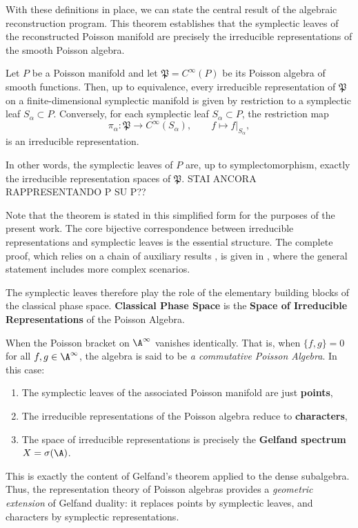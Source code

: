 With these definitions in place, we can state the central result of the algebraic reconstruction program. This theorem establishes that the symplectic leaves of the reconstructed Poisson manifold are precisely the irreducible representations of the smooth Poisson algebra.

\begin{theorem}\label{thm:poisson-rep}
	Let \(P\) be a Poisson manifold and let \(\mathfrak P = C^\infty(P)\) be its Poisson algebra of smooth functions. Then, up to equivalence, every irreducible representation of \(\mathfrak P\) on a finite-dimensional symplectic manifold is given by restriction to a symplectic leaf \(S_\alpha \subset P\). Conversely, for each symplectic leaf \(S_\alpha \subset P\), the restriction map
	\[
	\pi_\alpha: \mathfrak P \to C^\infty(S_\alpha), \qquad f \mapsto f|_{S_\alpha},
	\]
	is an irreducible representation.
	
	In other words, the symplectic leaves of \(P\) are, up to symplectomorphism, exactly the irreducible representation spaces of \(\mathfrak P\).
	STAI ANCORA RAPPRESENTANDO P SU P??
\end{theorem}
\begin{remark} Note that the theorem is stated in this simplified form for the purposes of the present work. The core bijective correspondence between irreducible representations and symplectic leaves is the essential structure. The complete proof, which relies on a chain of auxiliary results \cite[Propositions 2.3.5, 2.3.7, 2.6.4 and Corollary 2.6.5]{landsmanMathematicalTopicsClassical1998}, is given in \cite[Theorem 2.6.7]{landsmanMathematicalTopicsClassical1998} , where the general statement includes more complex scenarios.
\end{remark}

The symplectic leaves therefore play the role of the elementary building blocks of the classical phase space. \textbf{Classical Phase Space} is the \textbf{Space of Irreducible Representations} of the Poisson Algebra.

\noindent When the Poisson bracket on \(\A^\infty\) vanishes identically. That is, when \(\{f,g\} = 0\) for all \(f,g \in \A^\infty\), the algebra is said to be \emph{a commutative Poisson Algebra}. In this case:

\begin{enumerate}
	\item The symplectic leaves of the associated Poisson manifold are just \textbf{points},
	\item The irreducible representations of the Poisson algebra reduce to \textbf{characters},
	\item The space of irreducible representations is precisely the \textbf{Gelfand spectrum} \(X = \sigma(\A)\).
\end{enumerate}
This is exactly the content of Gelfand's theorem applied to the dense subalgebra. Thus, the representation theory of Poisson algebras provides a \emph{geometric extension} of Gelfand duality: it replaces points by symplectic leaves, and characters by symplectic representations.

